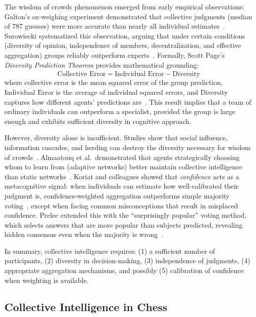 \documentclass{article}
\begin{document}
The wisdom of crowds phenomenon emerged from early empirical observations:
Galton's ox-weighing experiment demonstrated that collective judgments (median of 787 guesses) were more accurate than nearly all individual estimates~\cite{galton1907}.
Surowiecki systematized this observation, arguing that under certain conditions (diversity of opinion, independence of members, decentralization, and effective aggregation) groups reliably outperform experts~\cite{surowiecki2004}.
Formally, Scott Page's \emph{Diversity Prediction Theorem} provides mathematical grounding:
\begin{equation}
  \text{Collective Error} = \overline{\text{Individual Error}} - \text{Diversity}
\end{equation}
where collective error is the mean squared error of the group prediction, \(\overline{\text{Individual Error}}\) is the average of individual squared errors, and Diversity captures how different agents' predictions are~\cite{page2007}.
This result implies that a team of ordinary individuals can outperform a specialist, provided the group is large enough and exhibits sufficient diversity in cognitive approach.

However, diversity alone is insufficient.
Studies show that social influence, information cascades, and herding can destroy the diversity necessary for wisdom of crowds~\cite{surowiecki2004,almaatouq2020}.
Almaatouq et al.\ demonstrated that agents strategically choosing whom to learn from (adaptive networks) better maintain collective intelligence than static networks~\cite{almaatouq2020}.
Koriat and colleagues showed that \emph{confidence} acts as a metacognitive signal:
when individuals can estimate how well-calibrated their judgment is, confidence-weighted aggregation outperforms simple majority voting~\cite{koriat2011}, except when facing common misconceptions that result in misplaced confidence.
Prelec extended this with the ``surprisingly popular'' voting method, which selects answers that are more popular than subjects predicted, revealing hidden consensus even when the majority is wrong~\cite{prelec2017}.

In summary, collective intelligence requires:
(1) a sufficient number of participants,
(2) diversity in decision-making,
(3) independence of judgments,
(4) appropriate aggregation mechanisms, and possibly
(5) calibration of confidence when weighting is available.

\subsection{Collective Intelligence in Chess}
\end{document}
